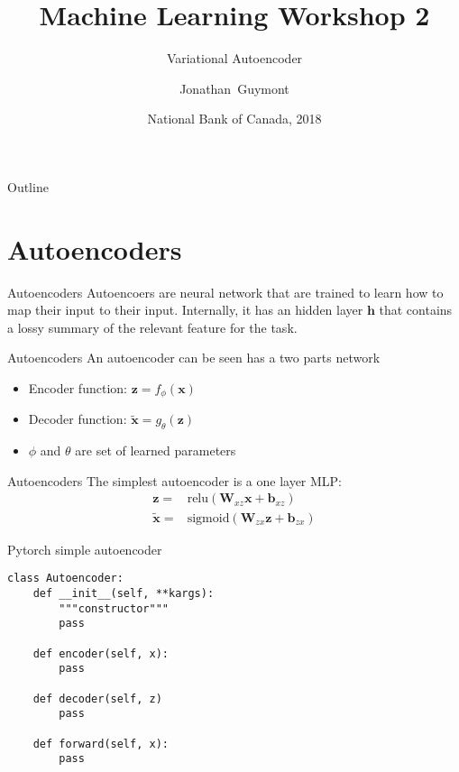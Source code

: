 \documentclass{beamer}
\title{Machine Learning Workshop 2}
\subtitle{Variational Autoencoder}
\author{Jonathan~Guymont}
\date{National Bank of Canada, 2018}
\newcommand{\relu}{\mathrm{relu}}
\newcommand{\sig}{\mathrm{sigmoid}}
\begin{document}
\begin{frame}
	\titlepage 
\end{frame}

\begin{frame}{Outline}
	\tableofcontents
\end{frame}

\section{Autoencoders}

\begin{frame}{Autoencoders}
Autoencoers are neural network that are trained to learn how to map their input to their input. Internally, it has an hidden layer $\bm{h}$ that contains a lossy summary of the relevant feature for the task.
\end{frame}
  
\begin{frame}{Autoencoders}
An autoencoder can be seen has a two parts network
\begin{itemize}
	\item Encoder function: $\bm{z}=f_\phi(\bm{x})$
	\item Decoder function: $\tilde{\bm{x}} = g_\theta(\bm{z})$
	\item $\phi$ and $\theta$ are set of learned parameters
\end{itemize}
\end{frame}

\begin{frame}{Autoencoders}
	The simplest autoencoder is a one layer MLP:
	\Large
	\begin{equation}
	\begin{split}
		\mathbf{z} =& \relu\left(\mathbf{W}_{xz}\mathbf{x}+\mathbf{b}_{xz}\right)\\
		\tilde{\mathbf{x}} =& \sig\left(\mathbf{W}_{zx}\mathbf{z}+\mathbf{b}_{zx}\right) 
	\end{split}
	\end{equation}
\end{frame}

\begin{frame}[fragile]{Pytorch simple autoencoder}
\begin{verbatim}
class Autoencoder:
	def __init__(self, **kargs):
	    """constructor"""
	    pass
	
	def encoder(self, x):
	    pass
	
	def decoder(self, z)
	    pass
	    
	def forward(self, x):
	    pass
\end{verbatim}
\end{frame}
\end{document}
